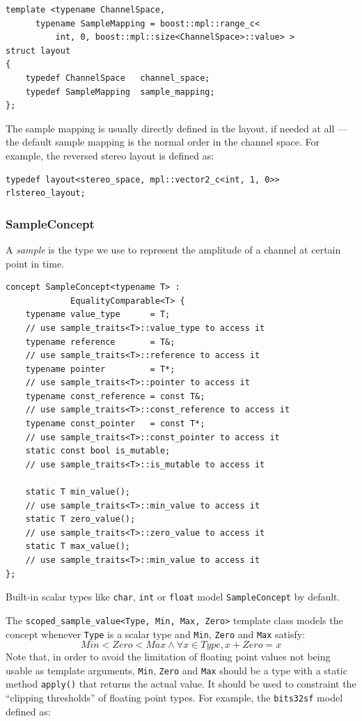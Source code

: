 \begin{lstlisting}
template <typename ChannelSpace,
	  typename SampleMapping = boost::mpl::range_c<
	      int, 0, boost::mpl::size<ChannelSpace>::value> >
struct layout
{
    typedef ChannelSpace   channel_space;
    typedef SampleMapping  sample_mapping;
};
\end{lstlisting}

The sample mapping is usually directly defined in the layout, if
needed at all --- the default sample mapping is the normal order in
the channel space. For example, the reversed stereo layout is defined
as:

\begin{lstlisting}
typedef layout<stereo_space, mpl::vector2_c<int, 1, 0>> rlstereo_layout;
\end{lstlisting}

\subsubsection{{SampleConcept}}

A \emph{sample} is the type we use to represent the
amplitude of a channel at certain point in time.

\begin{lstlisting}
concept SampleConcept<typename T> :
             EqualityComparable<T> {
    typename value_type      = T;
    // use sample_traits<T>::value_type to access it
    typename reference       = T&;
    // use sample_traits<T>::reference to access it
    typename pointer         = T*;
    // use sample_traits<T>::pointer to access it
    typename const_reference = const T&;
    // use sample_traits<T>::const_reference to access it
    typename const_pointer   = const T*;
    // use sample_traits<T>::const_pointer to access it
    static const bool is_mutable;
    // use sample_traits<T>::is_mutable to access it

    static T min_value(); 
    // use sample_traits<T>::min_value to access it
    static T zero_value(); 
    // use sample_traits<T>::zero_value to access it
    static T max_value(); 
    // use sample_traits<T>::min_value to access it
};
\end{lstlisting}

Built-in scalar types like \texttt{char}, \texttt{int} or
\texttt{float} model \texttt{Sample\-Concept} by default. 

The \texttt{scoped\_sample\_value<Type, Min, Max, Zero>} template
class models the concept whenever \texttt{Type} is a scalar type and
\texttt{Min}, \texttt{Zero} and \texttt{Max} satisfy:
\begin{equation}
Min < Zero < Max \land \forall x \in Type, x + Zero = x
\end{equation}
Note that, in order to avoid the limitation of floating point values
not being usable as template arguments, \texttt{Min}, \texttt{Zero}
and \texttt{Max} should be a type with a static method
\texttt{apply()} that returns the actual value. It should be used to
constraint the ``clipping thresholds'' of floating point types. For
example, the \texttt{bits32sf} model defined as:

